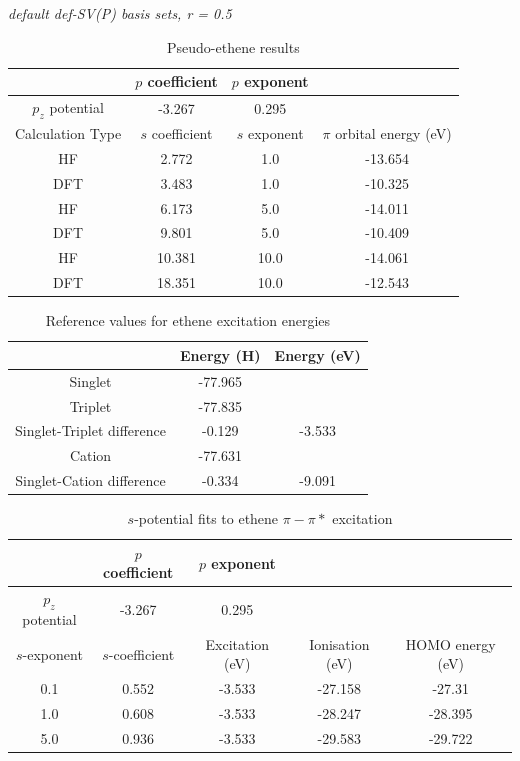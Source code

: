 \documentclass[journal=jctcce,manuscript=article]{achemso}
\begin{document}
\begin{table}[ht]
\caption{Pseudo-ethene results}
\textit{default def-SV(P) basis sets, r = 0.5}
\begin{tabular}{c c c c}
\hline\hline
& \(p\) coefficient & \(p\) exponent \\
\hline
\(p_{z}\) potential & -3.267 & 0.295 \\
\hline
Calculation Type & \(s\) coefficient & \(s\) exponent & \(\pi\) orbital energy (eV) \\
\hline
HF & 2.772 & 1.0 & -13.654 \\
DFT & 3.483 & 1.0 & -10.325 \\
HF & 6.173 & 5.0 & -14.011 \\
DFT & 9.801 & 5.0 & -10.409 \\
HF & 10.381 & 10.0 & -14.061 \\
DFT & 18.351 & 10.0 & -12.543 \\
\hline
\end{tabular}
\label{table:ethene_p_potentials}
\end{table}

\begin{table}[ht]
\caption{Reference values for ethene excitation energies}
\begin{tabular}{c c c }
\hline\hline
& Energy (H) & Energy (eV) \\
\hline
Singlet & -77.965 \\
Triplet & -77.835 \\
Singlet-Triplet difference & -0.129 & -3.533 \\
Cation & -77.631 \\
Singlet-Cation difference & -0.334 & -9.091 \\
\hline
\end{tabular}
\label{table:ref_ethene_exitation_energies}
\end{table}

\begin{table}[ht]
\caption{\(s\)-potential fits to ethene \(\pi-\pi*\) excitation}
\begin{tabular}{c c c c c}
\hline\hline
& \(p\) coefficient & \(p\) exponent \\
\hline
\(p_{z}\) potential & -3.267 & 0.295 \\
\hline
\(s\)-exponent & \(s\)-coefficient & Excitation (eV) & Ionisation (eV) & HOMO energy (eV) \\
\hline 
0.1 & 0.552 & -3.533 & -27.158 & -27.31 \\
1.0 & 0.608 & -3.533 & -28.247 & -28.395 \\
5.0 & 0.936 & -3.533 & -29.583 & -29.722 \\
\hline
\end{tabular}
\label{table:early_ethene_excitations}
\end{table}
\end{document}

